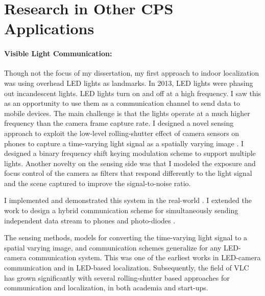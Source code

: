 \documentclass[10pt]{article}
\begin{document}
\section{Research in Other CPS Applications}
\paragraph{Visible Light Communication: }

Though not the focus of my dissertation, my first approach to indoor localization was using overhead LED lights as landmarks. In 2013, LED lights were phasing out incandescent lights. 
LED lights turn on and off at a high frequency. I saw this as an opportunity to use them as a communication channel to send data to mobile devices. The main challenge is that the lights operate at a much higher frequency than the camera frame capture rate. %
I designed a novel sensing approach to exploit the low-level rolling-shutter effect of camera sensors on phones to capture a time-varying light signal as a spatially varying image \cite{rajagopal2014visual, rajagopal2014demonstration}. %
I designed a binary frequency shift keying modulation scheme to support multiple lights.  
Another novelty on the sensing side was that I modeled the exposure and focus control of the camera as
filters that respond differently to the light signal and the scene
captured to improve the signal-to-noise ratio.

I implemented and demonstrated this system in the real-world \cite{rajagopal2014demonstration}. I extended the work to design a hybrid communication scheme %
for simultaneously sending independent data stream to phones and photo-diodes \cite{rajagopal2014hybrid}. 

The sensing methods, models for converting the time-varying light signal to a spatial varying image, and communication schemes generalize for any LED-camera communication system. This was one of the earliest works in LED-camera communication and in LED-based localization. Subsequently, the field of VLC has grown significantly with several rolling-shutter based
approaches for communication and localization, in both academia and
start-ups.
\end{document}
